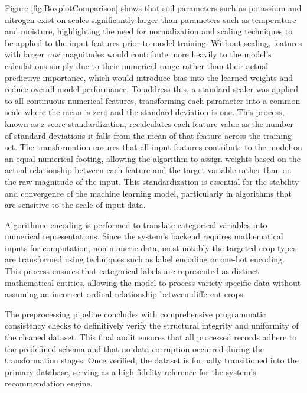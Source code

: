 {	Figure \ref{fig:BoxplotComparison} shows that soil parameters such as potassium and nitrogen exist on scales significantly larger than parameters such as temperature and moisture, highlighting the need for normalization and scaling techniques to be applied to the input features prior to model training. Without scaling, features with larger raw magnitudes would contribute more heavily to the model's calculations simply due to their numerical range rather than their actual predictive importance, which would introduce bias into the learned weights and reduce overall model performance.
	To address this, a standard scaler was applied to all continuous numerical features, transforming each parameter into a common scale where the mean is zero and the standard deviation is one. This process, known as z-score standardization, recalculates each feature value as the number of standard deviations it falls from the mean of that feature across the training set. The transformation ensures that all input features contribute to the model on an equal numerical footing, allowing the algorithm to assign weights based on the actual relationship between each feature and the target variable rather than on the raw magnitude of the input. This standardization is essential for the stability and convergence of the machine learning model, particularly in algorithms that are sensitive to the scale of input data.
	
	Algorithmic encoding is performed to translate categorical variables into numerical representations. Since the system’s backend requires mathematical inputs for computation, non-numeric data, most notably the targeted crop types are transformed using techniques such as label encoding or one-hot encoding. This process ensures that categorical labels are represented as distinct mathematical entities, allowing the model to process variety-specific data without assuming an incorrect ordinal relationship between different crops. 
	
	The preprocessing pipeline concludes with comprehensive programmatic consistency checks to definitively verify the structural integrity and uniformity of the cleaned dataset. This final audit ensures that all processed records adhere to the predefined schema and that no data corruption occurred during the transformation stages. Once verified, the dataset is formally transitioned into the primary database, serving as a high-fidelity reference for the system’s recommendation engine. 
	
}
